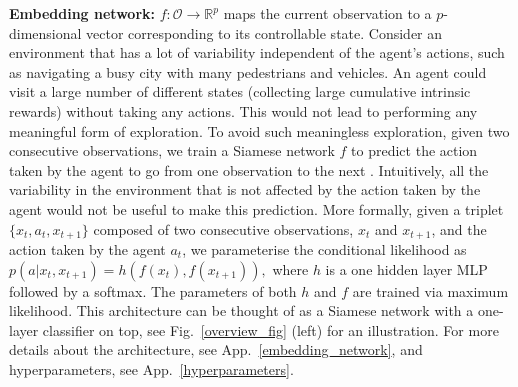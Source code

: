 \documentclass{article} %
\begin{document}
{\bf Embedding network:}
$f:\mathcal{O}\rightarrow\mathbb{R}^p$ maps the current observation to a $p$-dimensional vector corresponding to its controllable state.
Consider an environment that has a lot of variability independent of the agent's actions, such as navigating a busy city with many pedestrians and vehicles. An agent could visit a large number of different states (collecting large cumulative intrinsic rewards) without taking any actions. This would not lead to performing any meaningful form of exploration. 
To avoid such meaningless exploration, given two consecutive observations, we train a Siamese network \citep{bromley1994signature,koch2015siamese} $f$ to predict the action taken by the agent to go from one observation to the next \citep{pathak2017curiosity}. Intuitively, all the variability in the environment that is not affected by the action taken by the agent would not be useful to make this prediction.
%
More formally, given a triplet $\{x_t, a_t, x_{t+1}\}$ composed of two consecutive observations, $x_t$ and $x_{t+1}$, and the action taken by the agent $a_t$, we parameterise the conditional likelihood as 
%
$p(a | x_t, x_{t+1}) = h(f( x_t),f(x_{t+1})), $
%
where $h$ is a one hidden layer MLP followed by a softmax. The parameters of both $h$ and $f$ are trained via maximum likelihood. This architecture can be thought of as a Siamese network with a one-layer classifier on top, see Fig.~\ref{overview_fig} (left) for an illustration. For more details about the architecture, see App.~\ref{embedding_network}, and hyperparameters, see App.~\ref{hyperparameters}.
\end{document}
